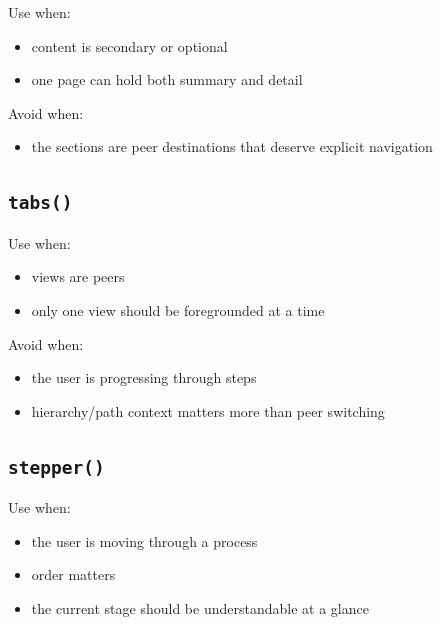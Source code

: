 Use when:

\begin{itemize}
\tightlist
\item
  content is secondary or optional
\item
  one page can hold both summary and detail
\end{itemize}

Avoid when:

\begin{itemize}
\tightlist
\item
  the sections are peer destinations that deserve explicit navigation
\end{itemize}

\subsection{\texorpdfstring{\texttt{t\allowbreak{}a\allowbreak{}b\allowbreak{}s\allowbreak{}(\allowbreak{})}}{}}\label{record-023-tabs}

Use when:

\begin{itemize}
\tightlist
\item
  views are peers
\item
  only one view should be foregrounded at a time
\end{itemize}

Avoid when:

\begin{itemize}
\tightlist
\item
  the user is progressing through steps
\item
  hierarchy/path context matters more than peer switching
\end{itemize}

\subsection{\texorpdfstring{\texttt{s\allowbreak{}t\allowbreak{}e\allowbreak{}p\allowbreak{}p\allowbreak{}e\allowbreak{}r\allowbreak{}(\allowbreak{})}}{}}\label{record-023-stepper}

Use when:

\begin{itemize}
\tightlist
\item
  the user is moving through a process
\item
  order matters
\item
  the current stage should be understandable at a glance
\end{itemize}

